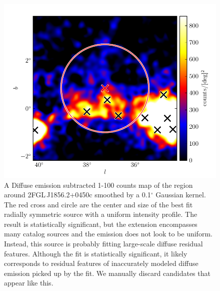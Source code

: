 \documentclass[12pt,preprint]{aastex}
\newcommand{\gev}{\text{GeV}\xspace}
\renewcommand{\deg}{\ensuremath{^\circ}\xspace}
\begin{document}
\clearpage
\begin{figure}
  \begin{center}
    \includegraphics{source_plots/example_bad_fit.pdf}
    \caption{
    A Diffuse emission subtracted 1-100 \gev counts map of the region
    around 2FGL\,J1856.2+0450c smoothed by a 0.1\deg Gaussian kernel. The
    red cross and circle are the center and size of the best fit radially
    symmetric source with a uniform intensity profile. The result is
    statistically significant, but the extension encompasses many catalog
    sources and the emission does not look to be uniform. Instead,
    this source is probably fitting large-scale diffuse residual
    features. Although the fit is statistically significant, it likely
    corresponds to residual features of inaccurately modeled diffuse
    emission picked up by the fit.  We manually discard candidates that
    appear like this.
    }
    \label{example_bad_fit}
  \end{center}
\end{figure}
\end{document}
